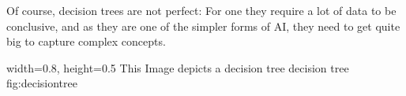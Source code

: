 Of course, decision trees are not perfect: For one they require a lot of data to be conclusive, and as they are one of the simpler forms of AI, they need to get quite big to capture complex concepts.

    {width=0.8\textwidth, height=0.5\textheight} %
    {This Image depicts a decision tree}   %
    {decision tree}   %
    {fig:decisiontree}    %

 